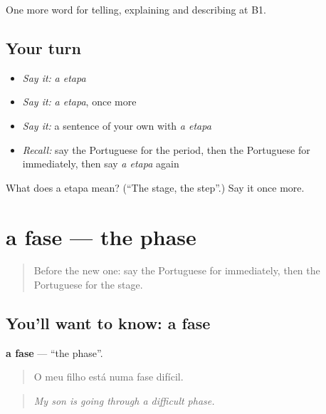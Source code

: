 \begin{grammarlens}[title={What you've built}]
One more word for telling, explaining and describing at B1.
\end{grammarlens}

\subsection*{Your turn}
\begin{itemize}
\raggedright
  \item \emph{Say it:} \emph{a etapa}
  \item \emph{Say it:} \emph{a etapa}, once more
  \item \emph{Say it:} a sentence of your own with \emph{a etapa}
  \item \emph{Recall:} say the Portuguese for the period, then the Portuguese for immediately, then say \emph{a etapa} again
\end{itemize}

\begin{tcolorbox}[breakable,colback=teal!4,colframe=teal!35!black,title={Before you move on}]
What does a etapa mean? (\textquotedblleft{}The stage, the step\textquotedblright{}.) Say it once more.
\end{tcolorbox}
\section[a fase]{a fase — the phase}

\label{lesson:PT-C273-fase}



\begin{quote}
Before the new one: say the Portuguese for immediately, then the Portuguese for the stage.
\end{quote}

\subsection*{You'll want to know: a fase}
\textbf{a fase} — \textquotedblleft{}the phase\textquotedblright{}.

\begin{quote}
O meu filho está numa fase difícil.
\end{quote}

\begin{quote}
\emph{My son is going through a difficult phase.}
\end{quote}

